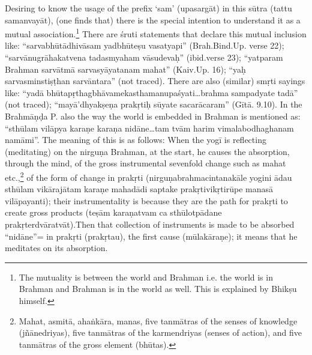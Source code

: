 Desiring to know the usage of the prefix ‘sam’ (upasargāt) in this sūtra  (tattu samanvayāt), (one finds that) there is the special intention to understand it as a mutual association.\footnote{The mutuality is between the world and Brahman i.e. the world is in Brahman and Brahman is in the world as well. This is explained by Bhikṣu himself.} There are śruti statements that declare this mutual inclusion like: “sarvabhūtādhivāsam yad\break bhūteṣu vasatyapi” (Brah.Bind.Up. verse 22); “sarvānugrāhakatvena tadasmyaham vāsudevaḥ” (ibid.verse 23); “yatparam Brahman sarvā\-tmā sarvasyāyatanam mahat” (Kaiv.Up. 16); “yaḥ sarvasminstiṣṭhan sarvāntara” (not traced). There are also (similar) smṛti sayings like: “yadā bhūtapṛthagbhāvamekasthamanupaśyati…brahma sampadyate tadā” (not traced); “mayā’dhyakṣeṇa prakṛtiḥ sūyate sacarācaram” (Gītā. 9.10). In the Brahmāṇḍa P. also the way the world is embedded in Brahman is mentioned as: “sthūlam vilāpya karaṇe karaṇa nidāne…tam tvām harim vimalabodhaghanam namāmi”. The meaning of this is as follows: When the yogī is reflecting (meditating) on the nirguṇa Brahman, at the start, he causes the absorption, through the mind, of the gross instrumental sevenfold change such as mahat etc.,\footnote{Mahat, asmitā, ahaṅkāra, manas, five tanmātras of the senses of knowledge (jñānedriyas), five tanmātras of the karmendriyas (senses of action), and five tanmātras of the gross element (bhūtas).} of the form of change in prakṛti (nirguṇabrahmacintanakāle yogini ādau sthūlam vikārajātam karaṇe mahadādi  saptake prakṛtivikṛtirūpe manasā vilāpayanti); their instrumentality is because they are the path for prakṛti to create gross products (teṣām karaṇatvam ca sthūlotpādane prakṛterdvāratvāt).Then that collection of instruments is made to be absorbed “nidāne”= in prakṛti (prakṛtau), the first cause (mūlakāraṇe); it means that he meditates on its absorption. 

